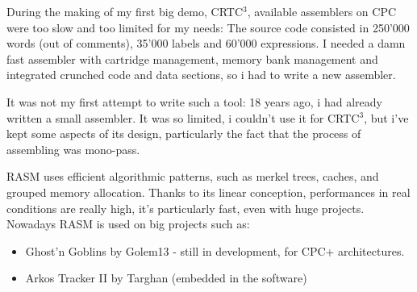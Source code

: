 \begin{xen}
During the making of my first big demo, CRTC$^3$, available assemblers on CPC were too slow and too limited for my needs: The source code consisted in 250'000 words (out of comments), 35'000 labels and 60'000 expressions. I needed a damn fast assembler with cartridge management, memory bank management and integrated crunched code and data sections, so i had to write a new assembler.

It was not my first attempt to write such a tool: 18 years ago, i had already written a small assembler. It was so limited, i couldn't use it for CRTC$^3$, but i've kept some aspects of its design, particularly the fact that the process of assembling was mono-pass.

RASM uses efficient algorithmic patterns, such as merkel trees, caches, and grouped memory allocation.
Thanks to its linear conception, performances in real conditions are really high, it's particularly fast, even with huge projects.
\medbreak
Nowadays RASM is used on big projects such as:
\begin{itemize}[noitemsep]
\item Ghost'n Goblins by Golem13 - still in development, for CPC+ architectures.
\item Arkos Tracker II by Targhan (embedded in the software) %
\end{itemize}

\end{xen}

\subsection{}

